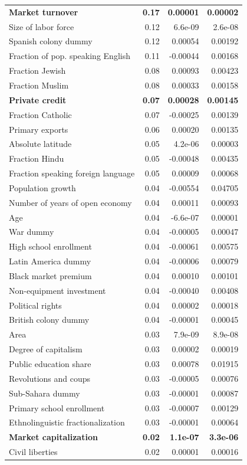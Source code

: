 \begin{refsection}
\begin{table}[!htbp]
\begin{tabular}{lrrr}
		\textbf{Market turnover} & \textbf{0.17} & \textbf{0.00001} & \textbf{0.00002} \\ 
		Size of labor force & 0.12 & 6.6e-09 & 2.6e-08 \\ 
		Spanish colony dummy & 0.12 & 0.00054 & 0.00192 \\ 
		Fraction of pop. speaking English & 0.11 & -0.00044 & 0.00168 \\ 
		Fraction Jewish & 0.08 & 0.00093 & 0.00423 \\ 
		Fraction Muslim & 0.08 & 0.00033 & 0.00158 \\ 
		\textbf{Private credit} & \textbf{0.07} & \textbf{0.00028} & \textbf{0.00145} \\ 
		Fraction Catholic & 0.07 & -0.00025 & 0.00139 \\ 
		Primary exports & 0.06 & 0.00020 & 0.00135 \\ 
		Absolute latitude & 0.05 & 4.2e-06 & 0.00003 \\ 
		Fraction Hindu & 0.05 & -0.00048 & 0.00435 \\ 
		Fraction speaking foreign language & 0.05 & 0.00009 & 0.00068 \\ 
		Population growth & 0.04 & -0.00554 & 0.04705 \\ 
		Number of years of open economy & 0.04 & 0.00011 & 0.00093 \\ 
		Age & 0.04 & -6.6e-07 & 0.00001 \\ 
		War dummy & 0.04 & -0.00005 & 0.00047 \\ 
		High school enrollment & 0.04 & -0.00061 & 0.00575 \\ 
		Latin America dummy & 0.04 & -0.00006 & 0.00079 \\ 
		Black market premium & 0.04 & 0.00010 & 0.00101 \\ 
		Non-equipment investment & 0.04 & -0.00040 & 0.00408 \\ 
		Political rights & 0.04 & 0.00002 & 0.00018 \\ 
		British colony dummy & 0.04 & -0.00001 & 0.00045 \\ 
		Area & 0.03 & 7.9e-09 & 8.9e-08 \\ 
		Degree of capitalism & 0.03 & 0.00002 & 0.00019 \\ 
		Public education share & 0.03 & 0.00078 & 0.01915 \\ 
		Revolutions and coups & 0.03 & -0.00005 & 0.00076 \\ 
		Sub-Sahara dummy & 0.03 & -0.00001 & 0.00087 \\ 
		Primary school enrollment & 0.03 & -0.00007 & 0.00129 \\ 
		Ethnolinguistic fractionalization & 0.03 & -0.00001 & 0.00064 \\ 
		\textbf{Market capitalization} & \textbf{0.02} & \textbf{1.1e-07} & \textbf{3.3e-06} \\
		Civil liberties & 0.02 & 0.00001 & 0.00016 \\ 
		\bottomrule 
	\end{tabular}
\end{table}


\end{refsection}
